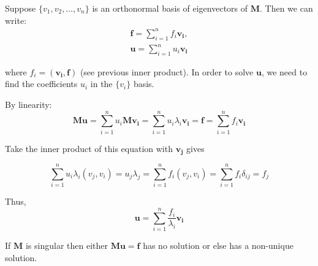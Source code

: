 \documentclass{article}
\theoremstyle{definition}
\begin{document}
Suppose $\{v_1,v_2,\ldots,v_n\}$ is an orthonormal basis of eigenvectors of $\mathbf{M}$. Then we can write:
\begin{align}
\mathbf{f}=\sum_{i=1}^{n}f_i\mathbf{v_i},\\
\mathbf{u}=\sum_{i=1}^{n}u_i\mathbf{v_i}
\end{align}

where $f_i=(\mathbf{v_i},\mathbf{f})$ (see previous inner product). In order to solve $\mathbf{u}$, we need to find the coefficients $u_i$ in the $\{v_i\}$ basis.


By linearity:
\begin{equation}
\mathbf{Mu}=\sum_{i=1}^{n}u_i \mathbf{Mv_i}=\sum_{i=1}^{n}u_i\lambda_i\mathbf{v_i}=\mathbf{f}=\sum_{i=1}^n f_i\mathbf{v_i}
\end{equation}


Take the inner product of this equation with $\mathbf{v_j}$ gives

\begin{equation}
\sum_{i=1}^n u_i\lambda_i(v_j,v_i)=u_j\lambda_j=\sum_{i=1}^nf_i(v_j,v_i)=\sum_{i=1}^n f_i\delta_{ij}=f_j
\end{equation}

Thus,
\begin{equation}
\mathbf{u}=\sum_{i=1}^n\frac{f_i}{\lambda_i}\mathbf{v_i}
\end{equation}


If $\mathbf{M}$ is singular then either $\mathbf{Mu=f}$ has no solution or else has a non-unique solution.
\end{document}

